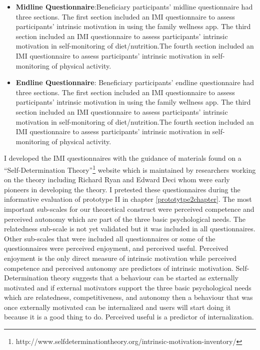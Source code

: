 \begin{enumerate}
\begin{itemize}
\item{\textbf{Midline Questionnaire}}:Beneficiary participants' midline questionnaire had three sections. The first section included an IMI questionnaire  to assess participants' intrinsic motivation in using the family wellness app. The third section included an IMI questionnaire to assess participants' intrinsic motivation in self-monitoring of diet/nutrition.The fourth section included an IMI questionnaire to assess participants' intrinsic motivation in self-monitoring of physical activity.

\item{\textbf{Endline Questionnaire}}: Beneficiary participants' endline questionnaire had three sections. The first section included an IMI questionnaire  to assess participants' intrinsic motivation in using the family wellness app. The third section included an IMI questionnaire to assess participants' intrinsic motivation in self-monitoring of diet/nutrition.The fourth section included an IMI questionnaire to assess participants' intrinsic motivation in self-monitoring of physical activity.
\end{itemize}
\end{enumerate}

I developed the IMI questionnaires with the guidance of materials found on a ``Self-Determination Theory''\footnote{http://www.selfdeterminationtheory.org/intrinsic-motivation-inventory/} website which is maintained by researchers working on the theory including Richard Ryan and Edward Deci\citep{deci1985intrinsic} whom were early pioneers in developing the theory. I pretested these questionnaires during the informative evaluation of prototype II in chapter \ref{prototytpe2chapter}. The most important sub-scales for our theoretical construct were perceived competence and perceived autonomy which are part of the three basic psychological needs. The relatedness sub-scale is not yet validated but it was included in all questionnaires. Other sub-scales that were included all questionnaires or some of the questionnaires were perceived enjoyment, and perceived useful. Perceived enjoyment is the only direct measure of intrinsic motivation while perceived competence and perceived autonomy are predictors of intrinsic motivation. Self-Determination theory suggests that a behaviour can be started as externally motivated and if external motivators support the three basic psychological needs which are relatedness, competitiveness, and autonomy then a behaviour that was once externally motivated can be internalized and users will start doing it because it is a good thing to do. Perceived useful is a predictor of internalization.


